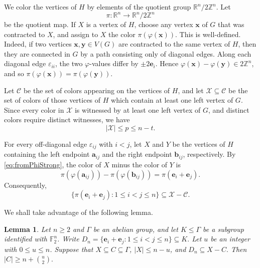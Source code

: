 \documentclass[11pt]{article}
\newtheorem{lemma}[theorem]{Lemma}
\theoremstyle{definition}
\begin{document}
We color the vertices of \(H\) by elements of the quotient group \(\mathbb{R}^{n}/2\mathbb{Z}^{n}\). Let
\[
    \pi:\mathbb{R}^{n}\to \mathbb{R}^{n}/2\mathbb{Z}^{n}
\]
be the quotient map. If \(X\) is a vertex of \(H\), choose any vertex \(\boldsymbol{x}\) of \(G\) that was contracted to \(X\), and assign to \(X\) the color \(\pi(\varphi(\boldsymbol{x}))\). This is well-defined. Indeed, if two vertices \(\boldsymbol{x},\boldsymbol{y}\in V(G)\) are contracted to the same vertex of \(H\), then they are connected in \(G\) by a path consisting only of diagonal edges. Along each diagonal edge \(\varepsilon_{ii}\), the two \(\varphi\)-values differ by \(\pm 2\boldsymbol{e}_i\). Hence \(\varphi(\boldsymbol{x})-\varphi(\boldsymbol{y})\in 2\mathbb{Z}^{n}\), and so
\( \pi(\varphi(\boldsymbol{x}))=\pi(\varphi(\boldsymbol{y})).
\)

Let \(\mathcal C\) be the set of colors appearing on the vertices of \(H\), and let \(\mathcal X\subseteq \mathcal C\) be the set of colors of those vertices of \(H\) which contain at least one left vertex of \(G\). Since every color in \(\mathcal X\) is witnessed by at least one left vertex of \(G\), and distinct colors require distinct witnesses, we have
\begin{equation}\label{eq:X-size}
    |\mathcal X|\le p\le n-t.
\end{equation}

For every off-diagonal edge \(\varepsilon_{ij}\) with \(i<j\), let \(X\) and \(Y\) be the vertices of \(H\) containing the left endpoint \(\boldsymbol{a}_{ij}\) and the right endpoint \(\boldsymbol{b}_{ij}\), respectively. By \eqref{eq:fromPhiStrong}, the color of \(X\) minus the color of \(Y\) is
\[
    \pi(\varphi(\boldsymbol{a}_{ij}))-\pi(\varphi(\boldsymbol{b}_{ij}))
    =\pi(\boldsymbol{e}_i+\boldsymbol{e}_j).
\]
Consequently,
\begin{equation}\label{eq:coverStrong}
    \{\pi(\boldsymbol{e}_i+\boldsymbol{e}_j):1\le i<j\le n\}\subseteq \mathcal X-\mathcal C.
\end{equation}

We shall take advantage of the following lemma.

\begin{lemma}\label{lem:coset}
Let \(n\ge 2\) and \(\Gamma\) be an abelian group, and let \(K\le \Gamma\) be a subgroup identified with \(\mathbb{F}_2^n\). Write
\(
    D_n=\{\boldsymbol{e}_i+\boldsymbol{e}_j:1\le i<j\le n\}\subseteq K.
\)
Let \(u\) be an integer with \(0\le u\le n\). Suppose that \(X\subseteq C\subseteq \Gamma\), \(|X|\le n-u\), and
\(
    D_n\subseteq X-C.
\)
Then
\(
    |C|\ge n+\binom{u}{2}.
\)
\end{lemma}
\end{document}
